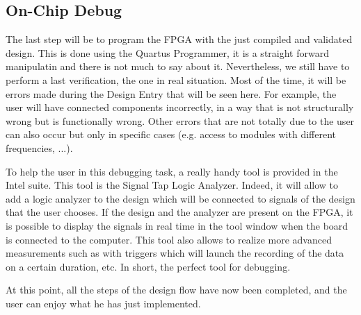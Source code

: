 \subsection{On-Chip Debug}

The last step will be to program the FPGA with the just compiled and validated design. This is done
using the Quartus Programmer, it is a straight forward manipulatin and there is not much to say
about it. Nevertheless, we still have to perform a last verification, the one in real situation. 
Most of the time, it will be errors made during the Design Entry that will be seen here. For 
example, the user will have connected components incorrectly, in a way that is not structurally 
wrong but is functionally wrong. Other errors that are not totally due to the user can also occur 
but only in specific cases (e.g. access to modules with different frequencies, ...).

To help the user in this debugging task, a really handy tool is provided in the Intel suite. This 
tool is the Signal Tap Logic Analyzer. Indeed, it will allow to add a logic analyzer to the design 
which will be connected to signals of the design that the user chooses. If the design and the 
analyzer are present on the FPGA, it is possible to display the signals in real time in the tool 
window when the board is connected to the computer. This tool also allows to realize more advanced 
measurements such as with triggers which will launch the recording of the data on a certain 
duration, etc. In short, the perfect tool for debugging.

At this point, all the steps of the design flow have now been completed, and the user can enjoy what 
he has just implemented.